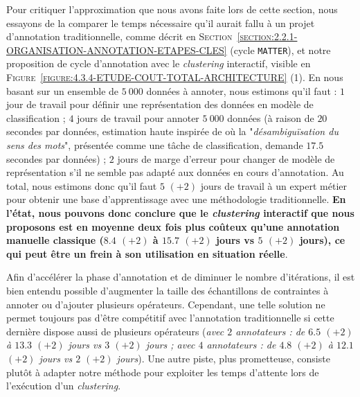 			Pour critiquer l'approximation que nous avons faite lors de cette section, nous essayons de la comparer le temps nécessaire qu'il aurait fallu à un projet d'annotation traditionnelle, comme décrit en \textsc{Section~\ref{section:2.2.1-ORGANISATION-ANNOTATION-ETAPES-CLES}} (cycle \texttt{MATTER}), et notre proposition de cycle d'annotation avec le \textit{clustering} interactif, visible en \textsc{Figure~\ref{figure:4.3.4-ETUDE-COUT-TOTAL-ARCHITECTURE}} (1).
			En nous basant sur un ensemble de $5~000$ données à annoter, nous estimons qu'il faut :
			$1$ jour de travail pour définir une représentation des données en modèle de classification ;
			$4$ jours de travail pour annoter $5~000$ données (à raison de $20$ secondes par données, estimation haute inspirée de \cite{pradhan-etal:2007:semeval2007-task-17} où la "\textit{désambiguïsation du sens des mots}", présentée comme une tâche de classification, demande $17.5$ secondes par données) ;
			$2$ jours de marge d'erreur pour changer de modèle de représentation s'il ne semble pas adapté aux données en cours d'annotation.
			Au total, nous estimons donc qu'il faut $5$ {\footnotesize $(+2)$} jours de travail à un expert métier pour obtenir une base d'apprentissage avec une méthodologie traditionnelle.
			\textbf{En l'état, nous pouvons donc conclure que le \textit{clustering} interactif que nous proposons est en moyenne deux fois plus coûteux qu'une annotation manuelle classique ($8.4$ {\footnotesize $(+2)$} à $15.7$ {\footnotesize $(+2)$} jours vs $5$ {\footnotesize $(+2)$} jours), ce qui peut être un frein à son utilisation en situation réelle}.
			
			Afin d'accélérer la phase d'annotation et de diminuer le nombre d'itérations, il est bien entendu possible d'augmenter la taille des échantillons de contraintes à annoter ou d'ajouter plusieurs opérateurs.
			Cependant, une telle solution ne permet toujours pas d'être compétitif avec l'annotation traditionnelle si cette dernière dispose aussi de plusieurs opérateurs (\textit{avec $2$ annotateurs : de $6.5$ {\footnotesize $(+2)$} à $13.3$ {\footnotesize $(+2)$} jours vs $3$ {\footnotesize $(+2)$} jours ; avec $4$ annotateurs : de $4.8$ {\footnotesize $(+2)$} à $12.1$ {\footnotesize $(+2)$} jours vs $2$ {\footnotesize $(+2)$} jours}).
			Une autre piste, plus prometteuse, consiste plutôt à adapter notre méthode pour exploiter les temps d'attente lors de l'exécution d'un \textit{clustering}.
			

